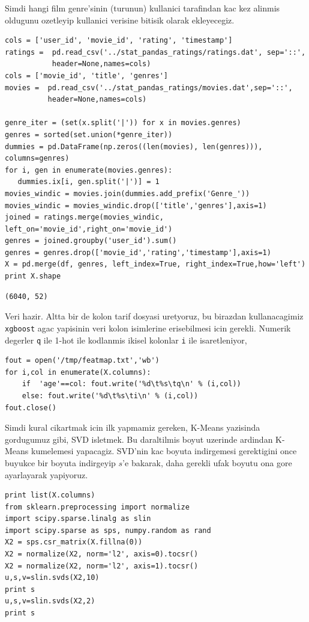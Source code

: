 \documentclass[12pt,fleqn]{article}\usepackage{../common}
\begin{document}
Simdi hangi film genre'sinin (turunun) kullanici tarafindan kac kez alinmis
oldugunu ozetleyip kullanici verisine bitisik olarak ekleyecegiz. 

\begin{verbatim}
cols = ['user_id', 'movie_id', 'rating', 'timestamp']
ratings =  pd.read_csv('../stat_pandas_ratings/ratings.dat', sep='::',
           header=None,names=cols)
cols = ['movie_id', 'title', 'genres']
movies =  pd.read_csv('../stat_pandas_ratings/movies.dat',sep='::',
          header=None,names=cols)

genre_iter = (set(x.split('|')) for x in movies.genres)
genres = sorted(set.union(*genre_iter))
dummies = pd.DataFrame(np.zeros((len(movies), len(genres))), columns=genres)
for i, gen in enumerate(movies.genres):
   dummies.ix[i, gen.split('|')] = 1
movies_windic = movies.join(dummies.add_prefix('Genre_'))
movies_windic = movies_windic.drop(['title','genres'],axis=1)
joined = ratings.merge(movies_windic, left_on='movie_id',right_on='movie_id')
genres = joined.groupby('user_id').sum()
genres = genres.drop(['movie_id','rating','timestamp'],axis=1)
X = pd.merge(df, genres, left_index=True, right_index=True,how='left')
print X.shape
\end{verbatim}

\begin{verbatim}
(6040, 52)
\end{verbatim}

Veri hazir. Altta bir de kolon tarif dosyasi uretyoruz, bu birazdan
kullanacagimiz \verb!xgboost! agac yapisinin veri kolon isimlerine
erisebilmesi icin gerekli. Numerik degerler \verb!q!  ile 1-hot ile
kodlanmis ikisel kolonlar \verb!i! ile isaretleniyor,

\begin{verbatim}
fout = open('/tmp/featmap.txt','wb')
for i,col in enumerate(X.columns):
    if  'age'==col: fout.write('%d\t%s\tq\n' % (i,col))
    else: fout.write('%d\t%s\ti\n' % (i,col))    
fout.close()
\end{verbatim}

Simdi kural cikartmak icin ilk yapmamiz gereken, K-Means yazisinda
gordugumuz gibi, SVD isletmek. Bu daraltilmis boyut uzerinde ardindan
K-Means kumelemesi yapacagiz. SVD'nin kac boyuta indirgemesi gerektigini
once buyukce bir boyuta indirgeyip $s$'e bakarak, daha gerekli ufak boyutu
ona gore ayarlayarak yapiyoruz.

\begin{verbatim}
print list(X.columns)
from sklearn.preprocessing import normalize
import scipy.sparse.linalg as slin
import scipy.sparse as sps, numpy.random as rand
X2 = sps.csr_matrix(X.fillna(0))
X2 = normalize(X2, norm='l2', axis=0).tocsr()
X2 = normalize(X2, norm='l2', axis=1).tocsr()    
u,s,v=slin.svds(X2,10)
print s
u,s,v=slin.svds(X2,2)
print s
\end{verbatim}
\end{document}
